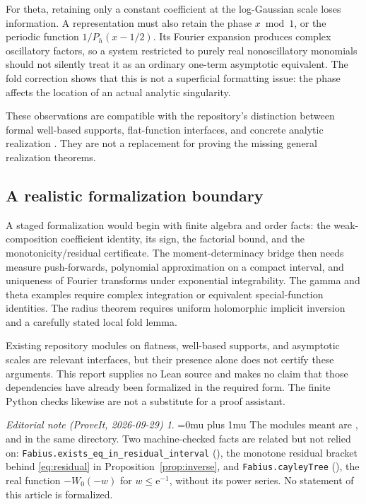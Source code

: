\documentclass[11pt,a4paper]{article}
\numberwithin{equation}{section}
\theoremstyle{definition}
\theoremstyle{remark}
\newtheorem*{ednoteinner}{Editorial note (ProveIt, 2026-09-29)}
\newenvironment{ednote}{\begin{ednoteinner}\sloppy\Urlmuskip=0mu plus 1mu\relax}{\end{ednoteinner}}
\newcommand{\ee}{\mathrm e}
\begin{document}
For theta, retaining only a constant coefficient at the log-Gaussian
scale loses information. A representation must also retain the phase
\(x\bmod1\), or the periodic function \(1/P_h(x-1/2)\). Its Fourier
expansion produces complex oscillatory factors, so a system restricted
to purely real nonoscillatory monomials should not silently treat it as
an ordinary one-term asymptotic equivalent. The fold correction shows
that this is not a superficial formatting issue: the phase affects the
location of an actual analytic singularity.

These observations are compatible with the repository's distinction
between formal well-based supports, flat-function interfaces, and
concrete analytic realization \cite{repo-series,repo-action}. They are
not a replacement for proving the missing general realization theorems.

\subsection{A realistic formalization boundary}
A staged formalization would begin with finite algebra and order facts:
the weak-composition coefficient identity, its sign, the factorial bound,
and the monotonicity/residual certificate. The moment-determinacy bridge
then needs measure push-forwards, polynomial approximation on a compact
interval, and uniqueness of Fourier transforms under exponential
integrability. The gamma and theta examples require complex integration
or equivalent special-function identities. The radius theorem requires
uniform holomorphic implicit inversion and a carefully stated local
fold lemma.

Existing repository modules on flatness, well-based supports, and
asymptotic scales are relevant interfaces, but their presence alone does
not certify these arguments. This report supplies no Lean source and
makes no claim that those dependencies have already been formalized in
the required form. The finite Python checks likewise are not a substitute
for a proof assistant.
\begin{ednote}
The modules meant are
,
 and  in the
same directory. Two machine-checked facts are related but not relied on:
\texttt{Fabius.exists\_eq\_in\_residual\_interval}
(),
the monotone residual bracket behind \eqref{eq:residual} in
Proposition~\ref{prop:inverse}, and \texttt{Fabius.cayleyTree}
(),
the real function \(-W_0(-w)\) for \(w\le\ee^{-1}\), without its power
series. No statement of this article is formalized.
\end{ednote}
\end{document}
